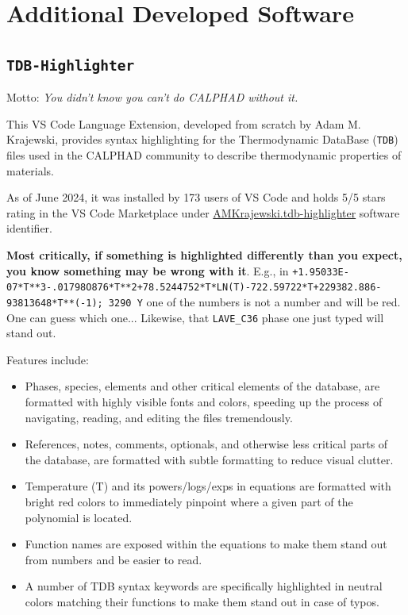 \chapter{Additional Developed Software} \label{chap:othersoft}


\section{\texttt{TDB-Highlighter}} \label{osoft:sec:tdbhighlighter}

\hspace{24pt} Motto: \textit{You didn't know you can't do CALPHAD without it.}

This VS Code Language Extension, developed from scratch by Adam M. Krajewski, provides syntax highlighting for the Thermodynamic DataBase (\texttt{TDB}) files used in the CALPHAD community to describe thermodynamic properties of materials. 

As of June 2024, it was installed by 173 users of VS Code and holds 5/5 stars rating in the VS Code Marketplace under \href{https://marketplace.visualstudio.com/items?itemName=amkrajewski.tdb-highlighter#review-details}{AMKrajewski.tdb-highlighter} software identifier.

\textbf{Most critically, if something is highlighted differently than you expect, you know something may be wrong with it}. E.g., in \texttt{+1.95033E-07*T**3-.01798O876*T**2+78.5244752*T*LN(T)-722.59722*T+229382.886-93813648*T**(-1); 3290 Y} one of the numbers is not a number and will be red. One can guess which one... Likewise, that \texttt{LAVE\_C36} phase one just typed will stand out.

Features include:
\begin{itemize}
    \item Phases, species, elements and other critical elements of the database, are formatted with highly visible fonts and colors, speeding up the process of navigating, reading, and editing the files tremendously.
    \item References, notes, comments, optionals, and otherwise less critical parts of the database, are formatted with subtle formatting to reduce visual clutter.
    \item Temperature (T) and its powers/logs/exps in equations are formatted with bright red colors to immediately pinpoint where a given part of the polynomial is located.
    \item Function names are exposed within the equations to make them stand out from numbers and be easier to read.
    \item A number of TDB syntax keywords are specifically highlighted in neutral colors matching their functions to make them stand out in case of typos.
\end{itemize}

